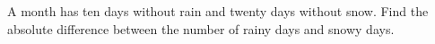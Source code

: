 A month has ten days without rain and twenty days without snow. Find the absolute difference between the number of rainy days and snowy days.

